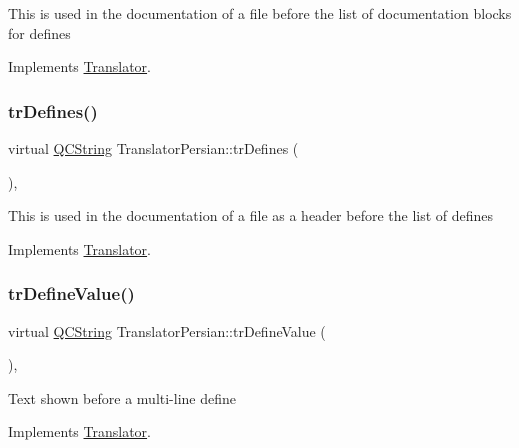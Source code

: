 This is used in the documentation of a file before the list of documentation blocks for defines 

Implements \mbox{\hyperlink{class_translator}{Translator}}.

\mbox{\label{class_translator_persian_a7d38fb09487c597c91e720a3c9413e0d}} 
\subsubsection{\texorpdfstring{trDefines()}{trDefines()}}
{\footnotesize\ttfamily virtual \mbox{\hyperlink{class_q_c_string}{Q\+C\+String}} Translator\+Persian\+::tr\+Defines (\begin{DoxyParamCaption}{ }\end{DoxyParamCaption})\hspace{0.3cm}{\ttfamily [inline]}, {\ttfamily [virtual]}}

This is used in the documentation of a file as a header before the list of defines 

Implements \mbox{\hyperlink{class_translator}{Translator}}.

\mbox{\label{class_translator_persian_a22e2b9347519495efc24b78d3fe811ee}} 
\subsubsection{\texorpdfstring{trDefineValue()}{trDefineValue()}}
{\footnotesize\ttfamily virtual \mbox{\hyperlink{class_q_c_string}{Q\+C\+String}} Translator\+Persian\+::tr\+Define\+Value (\begin{DoxyParamCaption}{ }\end{DoxyParamCaption})\hspace{0.3cm}{\ttfamily [inline]}, {\ttfamily [virtual]}}

Text shown before a multi-\/line define 

Implements \mbox{\hyperlink{class_translator}{Translator}}.

\mbox{\label{class_translator_persian_ab03dd3cc89e6ca841d0df8366a6e769e}} 
